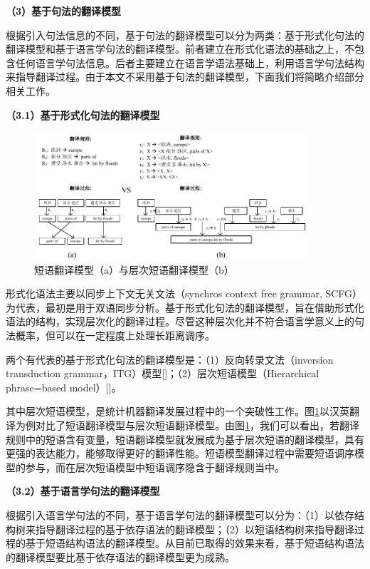 \textbf{（3）基于句法的翻译模型}

根据引入句法信息的不同，基于句法的翻译模型可以分为两类：基于形式化句法的翻译模型和基于语言学句法的翻译模型。前者建立在形式化语法的基础之上，不包含任何语言学句法信息。后者主要建立在语言学语法基础上，利用语言学句法结构来指导翻译过程。由于本文不采用基于句法的翻译模型，下面我们将简略介绍部分相关工作。

\textbf{（3.1）基于形式化句法的翻译模型}

\begin{figure}[tb]
	\centering
	\includegraphics[width=0.9\textwidth]{Figure/Figure_2_3.pdf}
	\caption{短语翻译模型（a）与层次短语翻译模型（b）}
	\label{Fig_smt_phrase_hier}
\end{figure}

形式化语法主要以同步上下文无关文法（synchros context free grammar, SCFG）为代表，最初是用于双语同步分析。基于形式化句法的翻译模型，旨在借助形式化语法的结构，实现层次化的翻译过程。尽管这种层次化并不符合语言学意义上的句法概率，但可以在一定程度上处理长距离调序。

两个有代表的基于形式化句法的翻译模型是：（1）反向转录文法（inversion transduction grammar，ITG）模型[\cite{Wu:1997}]；（2）层次短语模型（Hierarchical phrase=based model）[\cite{Chiang:2005,Chiang:2007}]。

其中层次短语模型，是统计机器翻译发展过程中的一个突破性工作。图\ref{Fig_smt_phrase_hier}以汉英翻译为例对比了短语翻译模型与层次短语翻译模型。由图\ref{Fig_smt_phrase_hier}，我们可以看出，若翻译规则中的短语含有变量，短语翻译模型就发展成为基于层次短语的翻译模型，具有更强的表达能力，能够取得更好的翻译性能。短语模型翻译过程中需要短语调序模型的参与，而在层次短语模型中短语调序隐含于翻译规则当中。

\textbf{（3.2）基于语言学句法的翻译模型}

根据引入语言学句法的不同，基于语言学句法的翻译模型可以分为：（1）以依存结构树来指导翻译过程的基于依存语法的翻译模型；（2）以短语结构树来指导翻译过程的基于短语结构语法的翻译模型。从目前已取得的效果来看，基于短语结构语法的翻译模型要比基于依存语法的翻译模型更为成熟。

